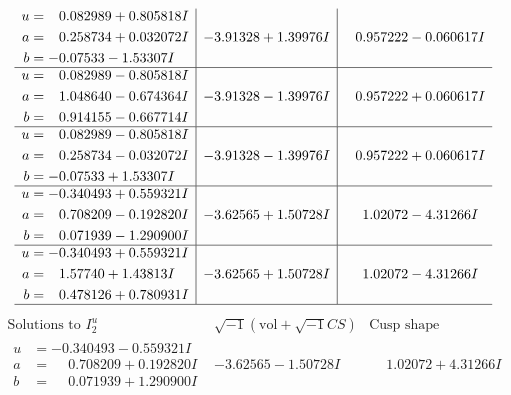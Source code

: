 \documentclass[1p]{elsarticle_modified}
\theoremstyle{definition}
\newcommand{\I}{\sqrt{-1}}
\begin{document}
$$\begin{array}{c|c|c}
\begin{aligned}
u &= \phantom{-}0.082989 + 0.805818 I \\
a &= \phantom{-}0.258734 + 0.032072 I \\
b &= -0.07533 - 1.53307 I\end{aligned}
 & -3.91328 + 1.39976 I & \phantom{-}0.957222 - 0.060617 I \\ \hline\begin{aligned}
u &= \phantom{-}0.082989 - 0.805818 I \\
a &= \phantom{-}1.048640 - 0.674364 I \\
b &= \phantom{-}0.914155 - 0.667714 I\end{aligned}
 & -3.91328 - 1.39976 I & \phantom{-}0.957222 + 0.060617 I \\ \hline\begin{aligned}
u &= \phantom{-}0.082989 - 0.805818 I \\
a &= \phantom{-}0.258734 - 0.032072 I \\
b &= -0.07533 + 1.53307 I\end{aligned}
 & -3.91328 - 1.39976 I & \phantom{-}0.957222 + 0.060617 I \\ \hline\begin{aligned}
u &= -0.340493 + 0.559321 I \\
a &= \phantom{-}0.708209 - 0.192820 I \\
b &= \phantom{-}0.071939 - 1.290900 I\end{aligned}
 & -3.62565 + 1.50728 I & \phantom{-}1.02072 - 4.31266 I \\ \hline\begin{aligned}
u &= -0.340493 + 0.559321 I \\
a &= \phantom{-}1.57740 + 1.43813 I \\
b &= \phantom{-}0.478126 + 0.780931 I\end{aligned}
 & -3.62565 + 1.50728 I & \phantom{-}1.02072 - 4.31266 I\\
 \hline 
 \end{array}$$\newpage$$\begin{array}{c|c|c}  
\text{Solutions to }I^u_{2}& \I (\text{vol} + \sqrt{-1}CS) & \text{Cusp shape}\\
 \hline 
\begin{aligned}
u &= -0.340493 - 0.559321 I \\
a &= \phantom{-}0.708209 + 0.192820 I \\
b &= \phantom{-}0.071939 + 1.290900 I\end{aligned}
 & -3.62565 - 1.50728 I & \phantom{-}1.02072 + 4.31266 I \\ \hline\begin{aligned}

\end{aligned}
\end{array}$$
\end{document}
